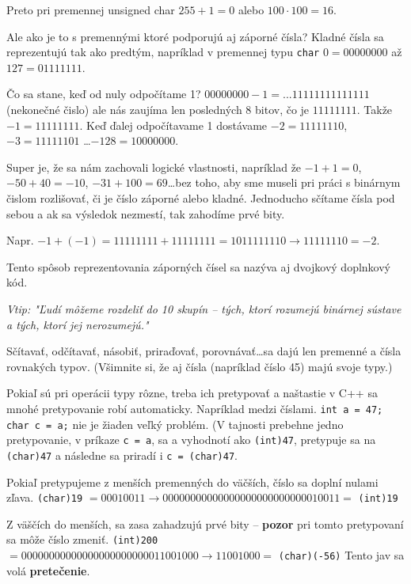 Preto pri premennej unsigned char $255+1 = 0$ alebo $100\cdot 100 = 16$.

\medskip

Ale ako je to s premennými ktoré podporujú aj záporné čísla?  Kladné čísla sa
reprezentujú tak ako predtým, napríklad v premennej typu \verb!char! $0 =
00000000$ až $127 = 01111111$.

Čo sa stane, keď od nuly odpočítame 1? $00000000 - 1 = ...11111111111111$
(nekonečné čislo) ale nás zaujíma len posledných 8 bitov, čo je $11111111$.
Takže $-1 = 11111111$. Keď ďalej odpočítavame 1 dostávame $-2 = 11111110$, $-3
= 11111101$ \dots $-128 = 10000000$. 

Super je, že sa nám zachovali logické vlastnosti, napríklad že $-1 + 1 = 0$,
$-50 + 40 = -10$, $-31 + 100 = 69$\dots bez toho, aby sme museli pri práci s
binárnym čislom rozlišovať, či je číslo záporné alebo kladné. Jednoducho
sčítame čísla pod sebou a ak sa výsledok nezmestí, tak zahodíme prvé bity.

Napr. $-1 + (-1) = 11111111 + 11111111 = 1011111110 \rightarrow 11111110 = -2$.

Tento spôsob reprezentovania záporných čísel sa nazýva aj dvojkový doplnkový
kód.

\textit{Vtip: "Ľudí môžeme rozdeliť do 10 skupín -- tých, ktorí rozumejú
binárnej sústave a tých, ktorí jej nerozumejú."}


Sčítavať, odčítavať, násobiť, priraďovať, porovnávať\dots sa dajú len premenné
a čísla rovnakých typov. (Všimnite si, že aj čísla (napríklad číslo 45) majú
svoje typy.)

Pokiaľ sú pri operácii typy rôzne, treba ich pretypovať a naštastie v
C++ sa mnohé pretypovanie robí automaticky. Napríklad medzi číslami.  
\verb!int a = 47; char c = a;! nie je žiaden veľký problém.  (V tajnosti
prebehne jedno pretypovanie, v príkaze \verb!c = a!, sa a vyhodnotí ako
\verb!(int)47!, pretypuje sa na \verb!(char)47! a následne sa priradí i
\verb!c = (char)47!.

Pokiaľ pretypujeme z menších premenných do väčších, číslo sa doplní nulami
zľava.  \verb!(char)19! $= 00010011 \rightarrow 00000000 00000000 00000000
00010011 =$ \verb!(int)19!

Z väščích do menších, sa zasa zahadzujú prvé bity -- \textbf{pozor} pri tomto
pretypovaní sa môže číslo zmeniť.  \verb!(int)200! $= 00000000 00000000
00000000 11001000 \rightarrow 11001000 =$ \verb!(char)(-56)!  Tento jav sa volá
\textbf{pretečenie}.

